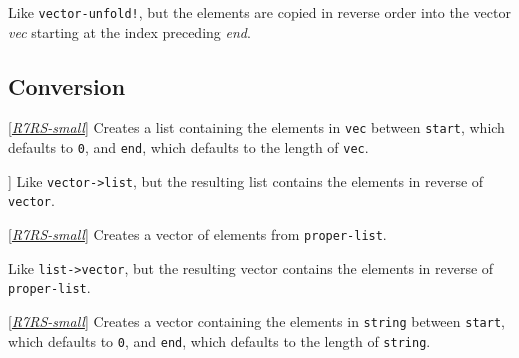 \begin{entry}{%
  }

  Like \texttt{vector-unfold!}, but the elements are copied in reverse
  order into the vector \emph{vec} starting at the index preceding
  \emph{end}.
\end{entry}

\subsection{Conversion}

\begin{entry}{%
  }

  {[}\protect\hyperlink{R7RS-small}{\emph{R7RS-small}}{]} Creates a
  list containing the elements in \texttt{vec} between \texttt{start},
  which defaults to \texttt{0}, and \texttt{end}, which defaults to
  the length of \texttt{vec}.
\end{entry}

\begin{entry}{%
  }

] Like \texttt{vector->list},
  but the resulting list contains the elements in reverse of
  \texttt{vector}.
\end{entry}

\begin{entry}{%
  }

  {[}\protect\hyperlink{R7RS-small}{\emph{R7RS-small}}{]} Creates a
  vector of elements from \texttt{proper-list}.
\end{entry}

\begin{entry}{%
  }

  Like \texttt{list->vector}, but the resulting vector contains the
  elements in reverse of \texttt{proper-list}.
\end{entry}

\begin{entry}{%
  }

  {[}\protect\hyperlink{R7RS-small}{\emph{R7RS-small}}{]} Creates a
  vector containing the elements in \texttt{string} between
  \texttt{start}, which defaults to \texttt{0}, and \texttt{end},
  which defaults to the length of \texttt{string}.
\end{entry}

